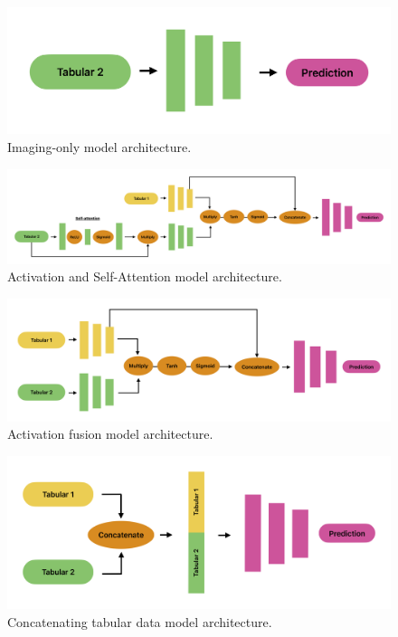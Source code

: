 \begin{figure}[h]
    \centering
    \includegraphics[width=0.8\linewidth]{figures//diagrams/Tabular2Unimodal}
    \caption{Imaging-only model architecture.}
    \label{fig:tabular2}
\end{figure}

\begin{figure}[h]
    \centering
    \includegraphics[width=1\linewidth]{figures//diagrams/ActivationandSelfAttention}
    \caption{Activation and Self-Attention model architecture.}
    \label{fig:activationandselfattention}
\end{figure}


\begin{figure}[h]
    \centering
    \includegraphics[width=1\linewidth]{figures//diagrams/ActivationFusion}
    \caption{Activation fusion model architecture.}
    \label{fig:ActivationFusion}
\end{figure}

\begin{figure}[h]
    \centering
    \includegraphics[width=1\linewidth]{figures//diagrams/ConcatTabularData}
    \caption{Concatenating tabular data model architecture.}
    \label{fig:ConcatTabularData}
\end{figure}

